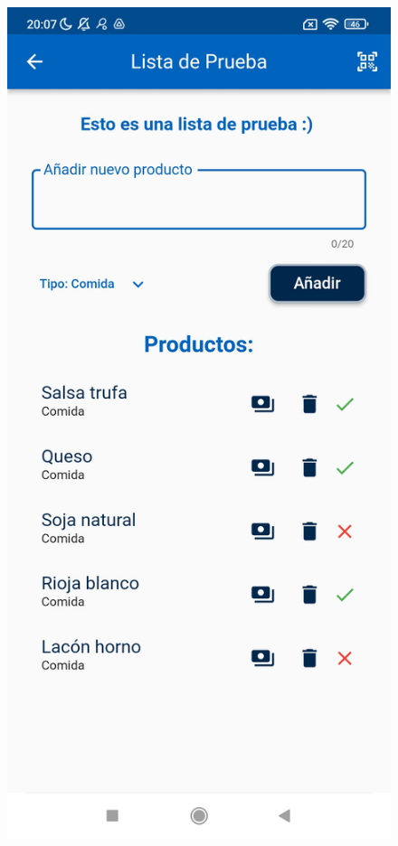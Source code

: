 \documentclass{article}
\begin{document}
\begin{figure}[h]
    \centering
    \begin{minipage}[h]{0.35\textwidth}
        \includegraphics[width=\textwidth]{imagenes/pantallas/listas/detalles.jpg}

\end{minipage}
\end{figure}
\end{document}

